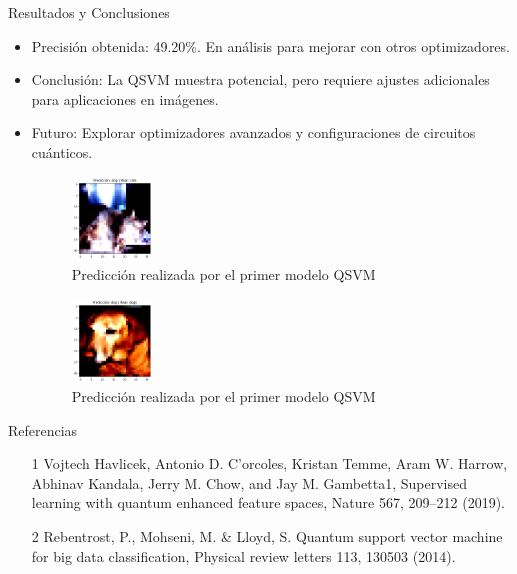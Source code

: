 \documentclass{beamer}
\begin{document}
\begin{frame}{Resultados y Conclusiones}
    \begin{itemize}
        \item Precisión obtenida: 49.20\%. En análisis para mejorar con otros optimizadores.
        \item Conclusión: La QSVM muestra potencial, pero requiere ajustes adicionales para aplicaciones en imágenes.
        \item Futuro: Explorar optimizadores avanzados y configuraciones de circuitos cuánticos.
        \begin{figure}
            \includegraphics[width=0.2\textwidth]{../images/presentation/output.png}
            \caption{Predicción realizada por el primer modelo QSVM}
        \end{figure}
        \begin{figure}
            \includegraphics[width=0.2\textwidth]{../images/presentation/output2.png}
            \caption{Predicción realizada por el primer modelo QSVM}
        \end{figure}
    \end{itemize}
\end{frame}

\begin{frame}{Referencias}
    \begin{itemize}
        \item [1] Vojtech Havlicek, Antonio D. C'orcoles, Kristan Temme, Aram W. Harrow, Abhinav Kandala, Jerry M. Chow, and Jay M. Gambetta1, Supervised learning with quantum enhanced feature spaces, Nature 567, 209–212 (2019).

        \item [2] Rebentrost, P., Mohseni, M. \& Lloyd, S. Quantum support vector machine for big data classification, Physical review letters 113, 130503 (2014).
    \end{itemize}
\end{frame}
\end{document}
